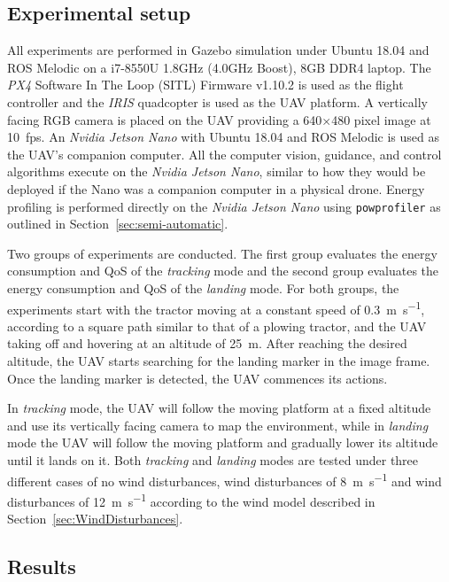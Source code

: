 \documentclass[conference]{IEEEtran}
\newcommand{\stt}[1]{{\small\tt #1}} %
\newcommand{\powprof}{\stt{powprofiler}}
\begin{document}

\subsection{Experimental setup}

All experiments are performed in Gazebo simulation under Ubuntu 18.04
and ROS Melodic on a i7-8550U 1.8GHz (4.0GHz Boost), 8GB DDR4
laptop. The \emph{PX4} Software In The Loop (SITL) Firmware v1.10.2 is used as the flight
controller and the \emph{IRIS} quadcopter is used as the UAV platform. A
vertically facing RGB camera is placed on the UAV providing a
640$\times$480 pixel image at 10~fps. An \emph{Nvidia Jetson Nano}
with Ubuntu 18.04 and ROS Melodic is used as the UAV's companion
computer. All the computer vision, guidance, and control algorithms 
execute on the \emph{Nvidia Jetson Nano}, similar to how they would
be deployed if the Nano was a companion computer in a physical drone.
%
Energy profiling is performed directly on the \emph{Nvidia Jetson
  Nano} using \powprof{} as outlined in Section~\ref{sec:semi-automatic}.

Two groups of experiments are conducted. The first group evaluates the
energy consumption and QoS of the \emph{tracking} mode and the second group
evaluates the energy consumption and QoS of the \emph{landing} mode. For
both groups, the experiments start with the tractor moving at a
constant speed of \SI{0.3}{\meter\per\second}, according to a square path similar to that of a
plowing tractor, and the UAV taking off and hovering at an altitude of
\SI{25}{\meter}. After reaching the desired altitude, the UAV starts searching
for the landing marker in the image frame. Once the landing marker is
detected, the UAV commences its actions.

In \emph{tracking} mode, the UAV will follow the moving platform at a fixed
altitude and use its vertically facing camera to map the environment,
while in \emph{landing} mode the UAV will follow the moving platform and
gradually lower its altitude until it lands on it. Both \emph{tracking} and
\emph{landing} modes are tested under three different cases of no wind
disturbances, wind disturbances of \SI{8}{\meter \per \second} and wind disturbances of
\SI{12}{\meter \per \second} according to the wind model described in Section~\ref{sec:WindDisturbances}.


\subsection{Results}
\end{document}
